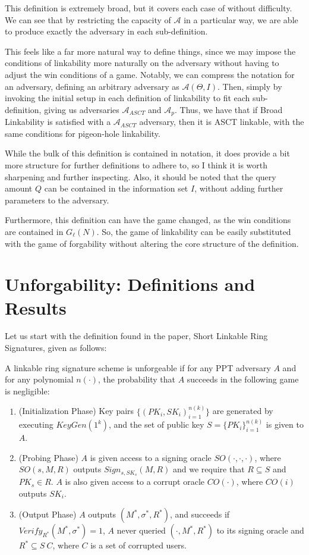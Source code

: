 \documentclass[12pt,titlepage]{article}
\begin{document}
This definition is extremely broad, but it covers each case of without difficulty. We can see that by restricting the capacity of $\mathcal{A}$ in a particular way, we are able to produce exactly the adversary in each sub-definition.

This feels like a far more natural way to define things, since we may impose the conditions of linkability more naturally on the adversary without having to adjust the win conditions of a game. Notably, we can compress the notation for an adversary, defining an arbitrary adversary as $\mathcal{A}(\Theta, I)$. Then, simply by invoking the initial setup in each definition of linkability to fit each sub-definition, giving us adversaries $\mathcal{A}_{ASCT}$ and $\mathcal{A}_{p}$. Thus, we have that if Broad Linkability is satisfied with a $\mathcal{A}_{ASCT}$ adversary, then it is ASCT linkable, with the same conditions for pigeon-hole linkability. 

While the bulk of this definition is contained in notation, it does provide a bit more structure for further definitions to adhere to, so I think it is worth sharpening and further inspecting. Also, it should be noted that the query amount $Q$ can be contained in the information set $I$, without adding further parameters to the adversary.

Furthermore, this definition can have the game changed, as the win conditions are contained in $G_{\ell}(N)$. So, the game of linkability can be easily substituted with the game of forgability without altering the core structure of the definition.






\newpage 
\section{Unforgability: Definitions and Results}
Let us start with the definition found in the paper, Short Linkable Ring Signatures, given as follows:

A linkable ring signature scheme is unforgeable if for any PPT adversary $A$ and for any polynomial $n( \cdot )$, the probability that $A$ succeeds in the following game is negligible:
\begin{enumerate}
\item (Initialization Phase) Key pairs $\{(PK_i,SK_i)_{i = 1}^{n(k)}\}$ are generated by executing $KeyGen(1^k)$, and the set of public key $S = \{PK_i\}_{i = 1}^{n(k)}$ is given to $A$.
\item (Probing Phase) $A$ is given access to a signing oracle $SO(\cdot,\cdot,\cdot)$, where $SO(s,M,R)$ outputs $Sign_{s,SK_s}(M,R)$ and we require that $R \subseteq S$ and $PK_s \in R$. $A$ is also given access to a corrupt oracle $CO(\cdot)$, where $CO(i)$ outputs $SK_i$.
\item (Output Phase) $A$ outputs $(M^*,\sigma^*,R^*)$, and succeeds if $Verify_{R^*}(M^*,\sigma^*)=1$, $A$ never queried $(\cdot, M^*, R^*)$ to its signing oracle and $R^* \subseteq S \ C$, where $C$ is a set of corrupted users.
\end{enumerate}
\end{document}

